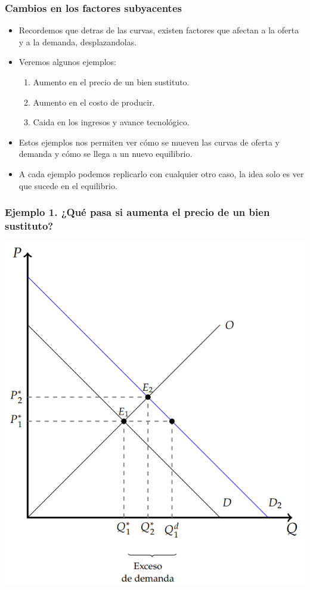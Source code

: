 \documentclass{beamer}
\begin{document}
\begin{frame}
\frametitle{Cambios en los factores subyacentes}
\begin{itemize}
    \item Recordemos que detras de las curvas, existen factores que afectan a la oferta y a la demanda, desplazandolas.
    \item Veremos algunos ejemplos:
    \begin{enumerate}
        \item Aumento en el precio de un bien sustituto.
        \item Aumento en el costo de producir.
        \item Caida en los ingresos y avance tecnológico.
    \end{enumerate}
    \item Estos ejemplos nos permiten ver cómo se mueven las curvas de oferta y demanda y cómo se llega a un nuevo equilibrio.
    \item A cada ejemplo podemos replicarlo con cualquier otro caso, la idea solo es ver que sucede en el equilibrio.
\end{itemize}
\end{frame}

\begin{frame}
\frametitle{Ejemplo 1. ¿Qué pasa si aumenta el precio de un bien sustituto?}
\centering
\includegraphics[scale=0.45]{../Figures/C15.6.png}
\end{frame}
\end{document}
